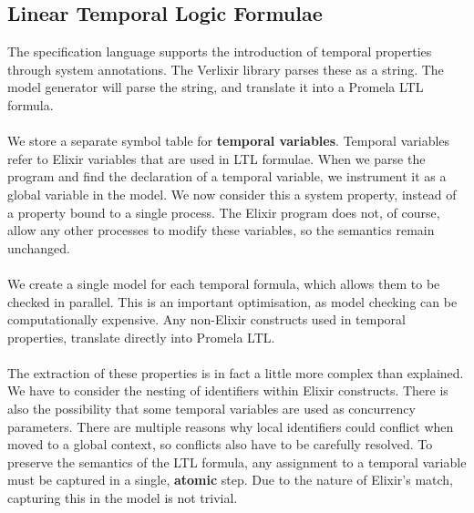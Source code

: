 \subsection{Linear Temporal Logic Formulae}
The specification language supports the introduction of temporal properties through system annotations. The Verlixir library parses these as a string. The model generator will parse the string, and translate it into a Promela LTL formula.
\\ \\
We store a separate symbol table for \textbf{temporal variables}. Temporal variables refer to Elixir variables that are used in LTL formulae. When we parse the program and find the declaration of a temporal variable, we instrument it as a global variable in the model. We now consider this a system property, instead of a property bound to a single process. The Elixir program does not, of course, allow any other processes to modify these variables, so the semantics remain unchanged.
\\ \\
We create a single model for each temporal formula, which allows them to be checked in parallel. This is an important optimisation, as model checking can be computationally expensive. Any non-Elixir constructs used in temporal properties, translate directly into Promela LTL.
\\ \\
The extraction of these properties is in fact a little more complex than explained. We have to consider the nesting of identifiers within Elixir constructs. There is also the possibility that some temporal variables are used as concurrency parameters. There are multiple reasons why local identifiers could conflict when moved to a global context, so conflicts also have to be carefully resolved. To preserve the semantics of the LTL formula, any assignment to a temporal variable must be captured in a single, \textbf{atomic} step. Due to the nature of Elixir's match, capturing this in the model is not trivial.

